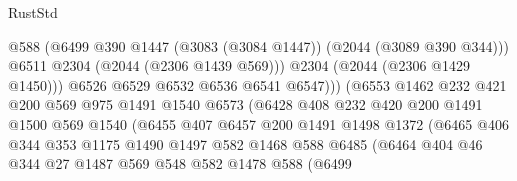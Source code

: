 \begin{lexlean}{RustStd}
\begin{coremodule}
                                    @588
                                    (@6499
                                      @390
                                      @1447
                                      (@3083 (@3084 @1447))
                                      (@2044 (@3089 @390 @344)))
                                    @6511
                                    @2304
                                    (@2044 (@2306 @1439 @569)))
                                  @2304
                                  (@2044 (@2306 @1429 @1450)))
                                @6526
                                @6529
                                @6532
                                @6536
                                @6541
                                @6547)))
                          (@6553
                            @1462
                            @232
                            @421
                            @200
                            @569
                            @975
                            @1491
                            @1540
                            @6573
                            (@6428
                              @408
                              @232
                              @420
                              @200
                              @1491
                              @1500
                              @569
                              @1540
                              (@6455
                                @407
                                @6457
                                @200
                                @1491
                                @1498
                                @1372
                                (@6465
                                  @406
                                  @344
                                  @353
                                  @1175
                                  @1490
                                  @1497
                                  @582
                                  @1468
                                  @588
                                  @6485
                                  (@6464
                                    @404
                                    @46
                                    @344
                                    @27
                                    @1487
                                    @569
                                    @548
                                    @582
                                    @1478
                                    @588
                                    (@6499

\end{coremodule}
\end{lexlean}
